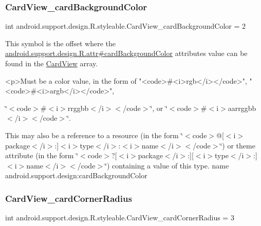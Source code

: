 \subsubsection{\texorpdfstring{Card\+View\+\_\+card\+Background\+Color}{CardView\_cardBackgroundColor}}
{\footnotesize\ttfamily int android.\+support.\+design.\+R.\+styleable.\+Card\+View\+\_\+card\+Background\+Color = 2\hspace{0.3cm}{\ttfamily [static]}}

This symbol is the offset where the \hyperlink{classandroid_1_1support_1_1design_1_1R_1_1attr_a1328a32ea9c593fc1f8a1a0b6f19e84e}{android.\+support.\+design.\+R.\+attr\#card\+Background\+Color} attribute\textquotesingle{}s value can be found in the \hyperlink{classandroid_1_1support_1_1design_1_1R_1_1styleable_a56025691fb136d28dc5fce5a25d7c65e}{Card\+View} array.

\begin{DoxyVerb}      <p>Must be a color value, in the form of "<code>#<i>rgb</i></code>", "<code>#<i>argb</i></code>",
\end{DoxyVerb}
 \char`\"{}$<$code$>$\#$<$i$>$rrggbb$<$/i$>$$<$/code$>$\char`\"{}, or \char`\"{}$<$code$>$\#$<$i$>$aarrggbb$<$/i$>$$<$/code$>$\char`\"{}. 

This may also be a reference to a resource (in the form \char`\"{}$<$code$>$@\mbox{[}$<$i$>$package$<$/i$>$\+:\mbox{]}$<$i$>$type$<$/i$>$\+:$<$i$>$name$<$/i$>$$<$/code$>$\char`\"{}) or theme attribute (in the form \char`\"{}$<$code$>$?\mbox{[}$<$i$>$package$<$/i$>$\+:\mbox{]}\mbox{[}$<$i$>$type$<$/i$>$\+:\mbox{]}$<$i$>$name$<$/i$>$$<$/code$>$\char`\"{}) containing a value of this type.  name android.\+support.\+design\+:card\+Background\+Color \mbox{\label{classandroid_1_1support_1_1design_1_1R_1_1styleable_a56013ce0ae69336c7d1e0f3c38902e3f}} 
\subsubsection{\texorpdfstring{Card\+View\+\_\+card\+Corner\+Radius}{CardView\_cardCornerRadius}}
{\footnotesize\ttfamily int android.\+support.\+design.\+R.\+styleable.\+Card\+View\+\_\+card\+Corner\+Radius = 3\hspace{0.3cm}{\ttfamily [static]}}

